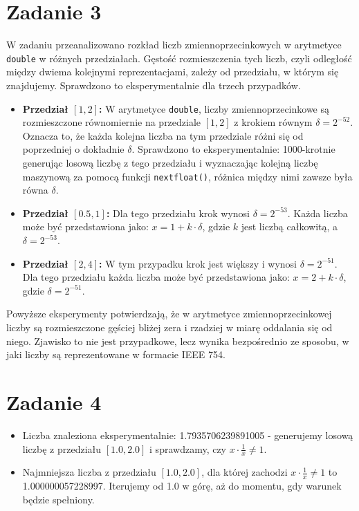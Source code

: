 \documentclass{article}
\begin{document}
\section*{Zadanie 3}

W zadaniu przeanalizowano rozkład liczb zmiennoprzecinkowych w arytmetyce \texttt{double} w różnych przedziałach. Gęstość rozmieszczenia tych liczb, czyli odległość między dwiema kolejnymi reprezentacjami, zależy od przedziału, w którym się znajdujemy. Sprawdzono to eksperymentalnie dla trzech przypadków.

\begin{itemize}
    \item \textbf{Przedział \([1, 2]\):} W arytmetyce \texttt{double}, liczby zmiennoprzecinkowe są rozmieszczone równomiernie na przedziale \([1, 2]\) z krokiem równym $\delta = 2^{-52}$. Oznacza to, że każda kolejna liczba na tym przedziale różni się od poprzedniej o dokładnie $\delta$. Sprawdzono to eksperymentalnie: 1000-krotnie generując losową liczbę z tego przedziału i wyznaczając kolejną liczbę maszynową za pomocą funkcji \texttt{nextfloat()}, różnica między nimi zawsze była równa $\delta$.

    \item \textbf{Przedział \([0.5, 1]\):} Dla tego przedziału krok wynosi $\delta = 2^{-53}$. Każda liczba może być przedstawiona jako: $x = 1 + k \cdot \delta$, gdzie $k$ jest liczbą całkowitą, a $\delta = 2^{-53}$.

    \item \textbf{Przedział \([2, 4]\):} W tym przypadku krok jest większy i wynosi $\delta = 2^{-51}$. Dla tego przedziału każda liczba może być przedstawiona jako: $x = 2 + k \cdot \delta$, gdzie $\delta = 2^{-51}$.
\end{itemize}

Powyższe eksperymenty potwierdzają, że w arytmetyce zmiennoprzecinkowej liczby są rozmieszczone gęściej bliżej zera i rzadziej w miarę oddalania się od niego. Zjawisko to nie jest przypadkowe, lecz wynika bezpośrednio ze sposobu, w jaki liczby są reprezentowane w formacie IEEE 754.
\section*{Zadanie 4}
\begin{itemize}
    \item Liczba znaleziona eksperymentalnie: 1.7935706239891005 - generujemy losową liczbę z przedziału \([1.0, 2.0]\) i sprawdzamy, czy $ x \cdot \frac{1}{x} \neq 1$. 
    \item Najmniejsza liczba z przedziału \([1.0, 2.0]\), dla której zachodzi \(x \cdot \frac{1}{x} \neq 1\) to 1.000000057228997. Iterujemy od 1.0 w górę, aż do momentu, gdy warunek będzie spełniony.
\end{itemize}
\end{document}
